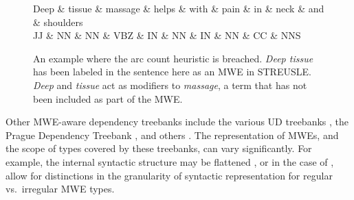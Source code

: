 \documentclass[output=paper
,modfonts
,nonflat]{langsci/langscibook}
\newcommand{\lex}[1]{\textit{#1}\xspace}
\begin{document}

\begin{figure*}
\begin{center}
\begin{adjustbox}{width=.8\textwidth}
    \begin{dependency}[edge style={black!60!black,thick},
        label style={thick}, scale=1.2]
        \centering
        \begin{deptext}[column sep=.7cm, row sep=.1ex]
          \color{red}Deep \& \color{red}tissue \& massage \& helps \& with \& pain \& in \& neck \& and \& shoulders \\
          \footnotesize{JJ} \& \footnotesize{NN} \& \footnotesize{NN} \& \footnotesize{VBZ} \& \footnotesize{IN} \& \footnotesize{NN} \& \footnotesize{IN} \& \footnotesize{NN} \& \footnotesize{CC} \& \footnotesize{NNS} \\
        \end{deptext}
    \end{dependency}
\end{adjustbox}
\end{center}
\caption{An example where the arc count heuristic is breached. \lex{Deep tissue} has been labeled in the sentence here as an MWE in STREUSLE. \lex{Deep} and \lex{tissue} act as modifiers to \lex{massage}, a term that has not been included as part of the MWE.}
\label{fig:arc-ex}
\end{figure*}


Other MWE-aware dependency treebanks include the various UD treebanks \citep{nivre2016universal}, the Prague Dependency Treebank \citep{bejvcek2013prague}, and others \citep{Nivre04,Eryigit:2011:MES:2206359.2206365,Candito14}. The representation of MWEs, and the scope of types covered by these treebanks, can vary significantly. For example, the internal syntactic structure may be flattened \citep{Nivre04}, or in the case of \citet{Candito14}, allow for distinctions in the granularity of syntactic representation for regular vs.\ irregular MWE types. 
\end{document}
